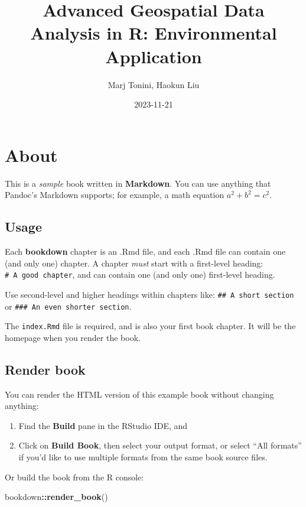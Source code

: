 \documentclass[
]{book}
\title{Advanced Geospatial Data Analysis in R: Environmental Application}
\author{Marj Tonini, Haokun Liu}
\date{2023-11-21}
\newenvironment{Shaded}{\begin{snugshade}}{\end{snugshade}}
\newcommand{\FunctionTok}[1]{\textcolor[rgb]{0.13,0.29,0.53}{\textbf{#1}}}
\newcommand{\NormalTok}[1]{#1}
\newcommand{\SpecialCharTok}[1]{\textcolor[rgb]{0.81,0.36,0.00}{\textbf{#1}}}
\theoremstyle{definition}
\theoremstyle{definition}
\theoremstyle{definition}
\theoremstyle{definition}
\theoremstyle{remark}
\begin{document}
\maketitle

{
\setcounter{tocdepth}{1}
\tableofcontents
}
\hypertarget{about}{%
\chapter{About}\label{about}}

This is a \emph{sample} book written in \textbf{Markdown}. You can use anything that Pandoc's Markdown supports; for example, a math equation \(a^2 + b^2 = c^2\).

\hypertarget{usage}{%
\section{Usage}\label{usage}}

Each \textbf{bookdown} chapter is an .Rmd file, and each .Rmd file can contain one (and only one) chapter. A chapter \emph{must} start with a first-level heading: \texttt{\#\ A\ good\ chapter}, and can contain one (and only one) first-level heading.

Use second-level and higher headings within chapters like: \texttt{\#\#\ A\ short\ section} or \texttt{\#\#\#\ An\ even\ shorter\ section}.

The \texttt{index.Rmd} file is required, and is also your first book chapter. It will be the homepage when you render the book.

\hypertarget{render-book}{%
\section{Render book}\label{render-book}}

You can render the HTML version of this example book without changing anything:

\begin{enumerate}
\def\labelenumi{\arabic{enumi}.}
\item
  Find the \textbf{Build} pane in the RStudio IDE, and
\item
  Click on \textbf{Build Book}, then select your output format, or select ``All formats'' if you'd like to use multiple formats from the same book source files.
\end{enumerate}

Or build the book from the R console:

\begin{Shaded}
\begin{Highlighting}[]
\NormalTok{bookdown}\SpecialCharTok{::}\FunctionTok{render\_book}\NormalTok{()}
\end{Highlighting}
\end{Shaded}
\end{document}
